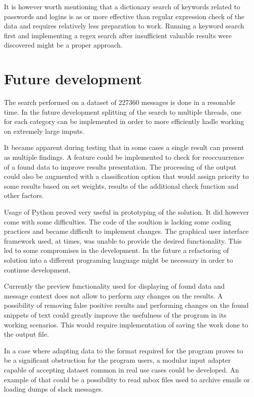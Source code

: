 \documentclass[a4paper,twoside,12pt]{book}
\begin{document}
It is however worth mentioning that a dictionary search of keywords related to passwords and
logins is as or more effective than regular expression check of the data and requires relatively
less preparation to work. Running a keyword search first and implementing a regex search after 
insufficient valuable results were discovered might be a proper approach.

\section{Future development}

The search performed on a dataset of 227360 messages is done in a resonable time. In the future development
splitting of the search to multiple threads, one for each category can be implemented in order to more efficiently
hadle working on extremely large imputs. 

It became apparent during testing that in some cases a single result can present as multiple findings. 
A feature could be implemented to check for reoccuurrence of a found data to improve
results presentation. The processing of the output could also be augmented with a classification
option that would assign priority to some results based on set weights, results of the additional
check function and other factors.
 
Usage of Python proved very useful in prototyping of the solution. It did however come with some difficulties.
The code of the soultion is lacking some coding practices and became difficult to implement changes.
The graphical user interface framework used, at times, was unable to provide the desired functionality. This led to some
compromises in the development. In the future a refactoring of solution into a different programing language might 
be necessary in order to continue development. 

Currently the preview functionality used for displaying of found data and message context 
does not allow to perform any changes on the results. A possibility of removing false positive 
results and performing changes on the found snippets of text could greatly improve the 
usefulness of the program in its working scenarios. This would require implementation of saving the work
done to the output file.

In a case where adapting data to the format required for the program proves to be a significant 
obstruction for the program users, a modular input adapter capable of accepting dataset common in 
real use cases could be developed. An example of that could be a possibility to read mbox files 
used to archive emails or loading dumps of slack messages.
\end{document}
